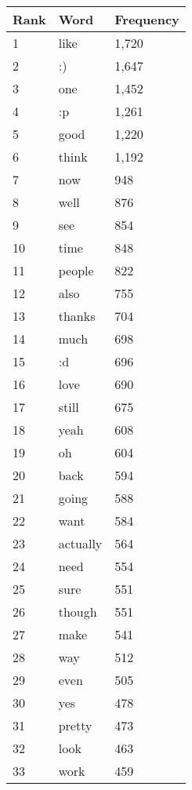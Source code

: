 \clearpage
\begin{table}[!htbp]
\begin{minipage}[b]{.5\textwidth}
	\centering
	\begin{tabular}{|l|l|l|} %
		\hline
		\textbf{Rank} & \textbf{Word} & \textbf{Frequency}  \\ \hline
		1 & like & 1,720 \\ \hline
		2 & :) & 1,647 \\ \hline
		3 & one & 1,452 \\ \hline
		4 & :p & 1,261 \\ \hline
		5 & good & 1,220 \\ \hline
		6 & think & 1,192 \\ \hline
		7 & now & 948 \\ \hline
		8 & well & 876 \\ \hline
		9 & see & 854 \\ \hline
		10 & time & 848 \\ \hline
		11 & people & 822 \\ \hline
		12 & also & 755 \\ \hline
		13 & thanks & 704 \\ \hline
		14 & much & 698 \\ \hline
		15 & :d & 696 \\ \hline
		16 & love & 690 \\ \hline 
		17 & still & 675 \\ \hline
		18 & yeah & 608 \\ \hline
		19 & oh & 604 \\ \hline
		20 & back & 594 \\ \hline
		21 & going & 588 \\ \hline
		22 & want & 584 \\ \hline
		23 & actually & 564 \\ \hline
		24 & need & 554 \\ \hline
		25 & sure & 551 \\ \hline
		26 & though & 551 \\ \hline
		27 & make & 541 \\ \hline
		28 & way & 512 \\ \hline
		29 & even & 505 \\ \hline
		30 & yes & 478 \\ \hline
		31 & pretty & 473 \\ \hline
		32 & look & 463 \\ \hline
		33 & work & 459 \\ \hline

\end{tabular}
\end{minipage}
\end{table}

